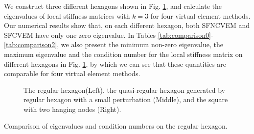 \documentclass[10pt]{amsart}
\theoremstyle{definition}
\theoremstyle{remark}
\begin{document}
\begin{enumerate}[1.]
We construct three different hexagons shown in Fig. \ref{fig:hexagon}, and calculate the eigenvalues of local stiffness matrices with $k=3$ for four virtual element methods. Our numerical results show that, on each different hexagon, both SFNCVEM and SFCVEM have only one zero eigenvalue. In Tables \ref{tab:comparison0}-\ref{tab:comparison2}, we also present the minimum non-zero eigenvalue, the maximum eigenvalue and the condition number for the local stiffness matrix on different hexagons in Fig. \ref{fig:hexagon}, by which we can see that these quantities are comparable for four virtual element methods.
\begin{figure}[htbp]
\;\;%
{}
\;\;%
{}
\caption{The regular hexagon(Left), the quasi-regular hexagon generated by regular
    hexagon with a small perturbation (Middle), 
and the square with two hanging nodes (Right).}
\label{fig:hexagon}
\end{figure}
\begin{table}[htbp]
\centering
\caption{Comparison of eigenvalues and condition numbers on the regular hexagon.}

\end{table}
\end{enumerate}
\end{document}
